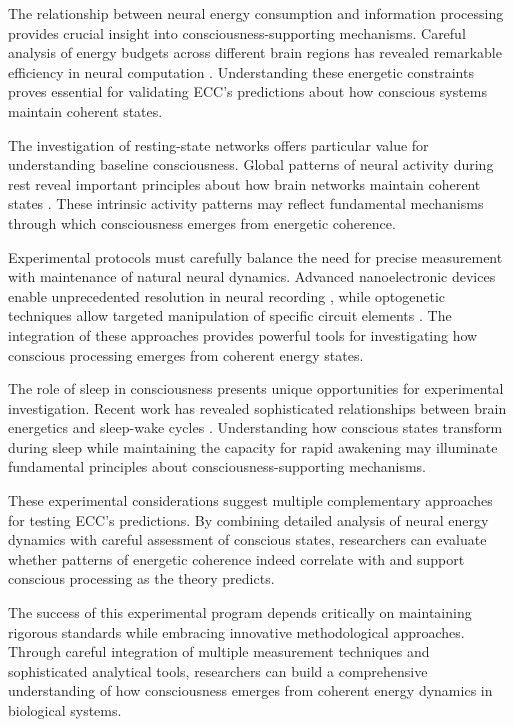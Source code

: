The relationship between neural energy consumption and information processing provides crucial insight into consciousness-supporting mechanisms. Careful analysis of energy budgets across different brain regions has revealed remarkable efficiency in neural computation \cite{Howarth2012}. Understanding these energetic constraints proves essential for validating ECC's predictions about how conscious systems maintain coherent states.

The investigation of resting-state networks offers particular value for understanding baseline consciousness. Global patterns of neural activity during rest reveal important principles about how brain networks maintain coherent states \cite{Scholvinck2013}. These intrinsic activity patterns may reflect fundamental mechanisms through which consciousness emerges from energetic coherence.

Experimental protocols must carefully balance the need for precise measurement with maintenance of natural neural dynamics. Advanced nanoelectronic devices enable unprecedented resolution in neural recording \cite{Kuzum2014}, while optogenetic techniques allow targeted manipulation of specific circuit elements \cite{Yizhar2011}. The integration of these approaches provides powerful tools for investigating how conscious processing emerges from coherent energy states.

The role of sleep in consciousness presents unique opportunities for experimental investigation. Recent work has revealed sophisticated relationships between brain energetics and sleep-wake cycles \cite{DiNuzzo2017}. Understanding how conscious states transform during sleep while maintaining the capacity for rapid awakening may illuminate fundamental principles about consciousness-supporting mechanisms.

These experimental considerations suggest multiple complementary approaches for testing ECC's predictions. By combining detailed analysis of neural energy dynamics with careful assessment of conscious states, researchers can evaluate whether patterns of energetic coherence indeed correlate with and support conscious processing as the theory predicts.

The success of this experimental program depends critically on maintaining rigorous standards while embracing innovative methodological approaches. Through careful integration of multiple measurement techniques and sophisticated analytical tools, researchers can build a comprehensive understanding of how consciousness emerges from coherent energy dynamics in biological systems.